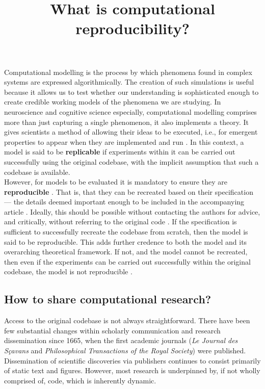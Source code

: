 \documentclass[jou]{apa6}
\title{What is computational reproducibility?}
\begin{document}
\maketitle

Computational modelling is the process by which phenomena found in complex systems are expressed algorithmically.
The creation of such simulations is useful because it allows us to test whether our understanding is sophisticated enough to create credible working models of the phenomena we are studying.
In neuroscience and cognitive science especially, computational modelling comprises more than just capturing a single phenomenon, it also  implements a theory.
It gives scientists a method of allowing their ideas to be executed, i.e., for emergent properties to appear when they are implemented and run \cite{mcclelland09}.
In this context, a model is said to be  \textbf{replicable} if experiments within it can be carried out successfully using the original codebase, with the implicit assumption that such a codebase is available.\\

However, for models to be evaluated
it is mandatory to ensure they are \textbf{reproducible} \cite{topalidou15}.  
That is, that they can be recreated based on their specification --- the details deemed important enough to be included in the accompanying article \cite{hinsen15}.
Ideally, this should be possible without contacting the authors for advice, and critically, without referring to the original code \cite{cooper14}.
If the specification is sufficient to successfully recreate the codebase from scratch, then the model is said to be reproducible.
This adds further credence to both the model and its overarching theoretical framework.
If not, and the model cannot be recreated, then even if the experiments can be carried out successfully within the original codebase, the model is not reproducible \cite{crook13}.

\subsection*{How to share computational research?}
Access to the original codebase is not always straightforward.
There have been few substantial changes within scholarly communication and research dissemination since 1665, when the first academic journals (\textit{Le Journal des Sçavans} and \textit{Philosophical Transactions of the Royal Society}) were published.
Dissemination of scientific discoveries via publishers continues to consist primarily of static text and figures.
However, most research is underpinned by, if not wholly comprised of, code, which is inherently dynamic.
\end{document}
